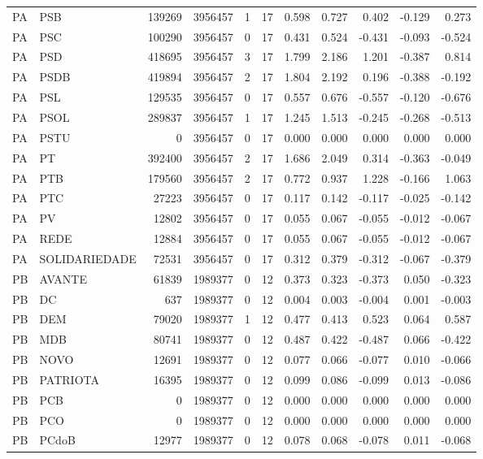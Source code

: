 \begin{landscape}
\begin{longtable}{llrrrrrrrrr}
PA & PSB & 139269 & 3956457 & 1 & 17 & 0.598 & 0.727 & 0.402 & -0.129 & 0.273 \\
PA & PSC & 100290 & 3956457 & 0 & 17 & 0.431 & 0.524 & -0.431 & -0.093 & -0.524 \\
PA & PSD & 418695 & 3956457 & 3 & 17 & 1.799 & 2.186 & 1.201 & -0.387 & 0.814 \\
PA & PSDB & 419894 & 3956457 & 2 & 17 & 1.804 & 2.192 & 0.196 & -0.388 & -0.192 \\
PA & PSL & 129535 & 3956457 & 0 & 17 & 0.557 & 0.676 & -0.557 & -0.120 & -0.676 \\
PA & PSOL & 289837 & 3956457 & 1 & 17 & 1.245 & 1.513 & -0.245 & -0.268 & -0.513 \\
PA & PSTU & 0 & 3956457 & 0 & 17 & 0.000 & 0.000 & 0.000 & 0.000 & 0.000 \\
PA & PT & 392400 & 3956457 & 2 & 17 & 1.686 & 2.049 & 0.314 & -0.363 & -0.049 \\
PA & PTB & 179560 & 3956457 & 2 & 17 & 0.772 & 0.937 & 1.228 & -0.166 & 1.063 \\
PA & PTC & 27223 & 3956457 & 0 & 17 & 0.117 & 0.142 & -0.117 & -0.025 & -0.142 \\
PA & PV & 12802 & 3956457 & 0 & 17 & 0.055 & 0.067 & -0.055 & -0.012 & -0.067 \\
PA & REDE & 12884 & 3956457 & 0 & 17 & 0.055 & 0.067 & -0.055 & -0.012 & -0.067 \\
PA & SOLIDARIEDADE & 72531 & 3956457 & 0 & 17 & 0.312 & 0.379 & -0.312 & -0.067 & -0.379 \\
PB & AVANTE & 61839 & 1989377 & 0 & 12 & 0.373 & 0.323 & -0.373 & 0.050 & -0.323 \\
PB & DC & 637 & 1989377 & 0 & 12 & 0.004 & 0.003 & -0.004 & 0.001 & -0.003 \\
PB & DEM & 79020 & 1989377 & 1 & 12 & 0.477 & 0.413 & 0.523 & 0.064 & 0.587 \\
PB & MDB & 80741 & 1989377 & 0 & 12 & 0.487 & 0.422 & -0.487 & 0.066 & -0.422 \\
PB & NOVO & 12691 & 1989377 & 0 & 12 & 0.077 & 0.066 & -0.077 & 0.010 & -0.066 \\
PB & PATRIOTA & 16395 & 1989377 & 0 & 12 & 0.099 & 0.086 & -0.099 & 0.013 & -0.086 \\
PB & PCB & 0 & 1989377 & 0 & 12 & 0.000 & 0.000 & 0.000 & 0.000 & 0.000 \\
PB & PCO & 0 & 1989377 & 0 & 12 & 0.000 & 0.000 & 0.000 & 0.000 & 0.000 \\
PB & PCdoB & 12977 & 1989377 & 0 & 12 & 0.078 & 0.068 & -0.078 & 0.011 & -0.068 \\

\end{longtable}
\end{landscape}
